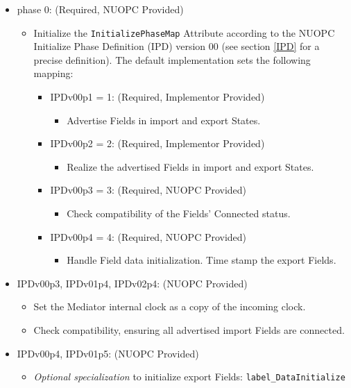 \begin{itemize}
\item phase 0: ({\sc Required, NUOPC Provided})
  \begin{itemize}
  \item Initialize the {\tt InitializePhaseMap} Attribute according to the NUOPC Initialize Phase Definition (IPD) version 00 (see section \ref{IPD} for a precise definition). The default implementation sets the following mapping:
    \begin{itemize}
    \item IPDv00p1 = 1: ({\sc Required, Implementor Provided})
      \begin{itemize}
      \item Advertise Fields in import and export States.
      \end{itemize}
    \item IPDv00p2 = 2: ({\sc Required, Implementor Provided})
      \begin{itemize}
      \item Realize the advertised Fields in import and export States.
      \end{itemize}  
    \item IPDv00p3 = 3: ({\sc Required, NUOPC Provided})
      \begin{itemize}
      \item Check compatibility of the Fields' Connected status.
      \end{itemize}
    \item IPDv00p4 = 4: ({\sc Required, NUOPC Provided})
      \begin{itemize}
      \item Handle Field data initialization. Time stamp the export Fields.
      \end{itemize}
    \end{itemize}  
  \end{itemize}  
\item IPDv00p3, IPDv01p4, IPDv02p4: ({\sc NUOPC Provided})
  \begin{itemize}
  \item Set the Mediator internal clock as a copy of the incoming clock. 
  \item Check compatibility, ensuring all advertised import Fields are connected.
  \end{itemize}  
\item IPDv00p4, IPDv01p5: ({\sc NUOPC Provided})
  \begin{itemize}
  \item {\it Optional specialization} to initialize export Fields: {\tt label\_DataInitialize}

\end{itemize}
\end{itemize}
